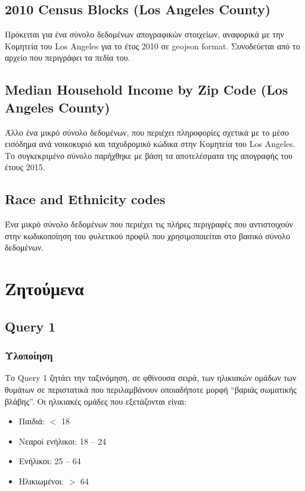 \documentclass{article}
\begin{document}
\subsection{ 2010 Census Blocks (Los Angeles County)}
Πρόκειται για ένα σύνολο δεδομένων απογραφικών στοιχείων, αναφορικά με την Κομητεία του Los Angeles για το έτος 2010 σε geojson format. Συνοδεύεται από το αρχείο που περιγράφει τα πεδία του.

\subsection{Median Household Income by Zip Code (Los Angeles County)}
Άλλο ένα μικρό σύνολο δεδομένων, που περιέχει πληροφορίες σχετικά με το μέσο εισόδημα ανά νοικοκυριό και ταχυδρομικό κώδικα στην Κομητεία του Los Angeles. Το συγκεκριμένο σύνολο παρήχθηκε με βάση τα αποτελέσματα της απογραφής του έτους 2015. 

\subsection{ Race and Ethnicity codes }
Ένα μικρό σύνολο δεδομένων που περιέχει τις πλήρες περιγραφές που
αντιστοιχούν στην κωδικοποίηση του φυλετικού προφίλ που χρησιμοποιείται στο βασικό σύνολο δεδομένων.

\section{ Ζητούμενα }
\subsection{Query 1}
\subsubsection*{Υλοποίηση}
Το Query 1 ζητάει την ταξινόμηση, σε φθίνουσα σειρά, των ηλικιακών ομάδων των θυμάτων σε περιστατικά που περιλαμβάνουν οποιαδήποτε μορφή “βαριάς σωματικής βλάβης”. Οι ηλικιακές ομάδες που εξετάζονται είναι:
\begin{itemize}
    \item Παιδιά: $<$ 18
    \item Νεαροί ενήλικοι: 18 – 24
    \item Ενήλικοι: 25 – 64
    \item Ηλικιωμένοι: $>$ 64
\end{itemize}
\end{document}
